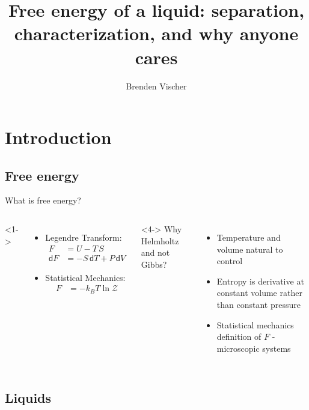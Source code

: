 \documentclass{beamer}
\title[Free energy of a liquid]{Free energy of a liquid: separation, characterization, and why anyone cares}
\author{Brenden Vischer}
\newcommand*{\diff}{\mathsf{d}}
\begin{document}


\begin{frame}
	\titlepage
\end{frame}


\section*{Introduction}
\subsection*{Free energy}
\begin{frame}{What is free energy?}
		\begin{columns}
			<1->
				\begin{itemize}[noitemsep]
				\item<2-> Legendre Transform: 
				\begin{align*}
				 	F &= U - T\,S\\
				 	\diff F &= - S\, \diff T + P\, \diff V
				\end{align*}
				\item<3-> Statistical Mechanics: 
				\begin{align*}
					F &= - k_B T \ln \mathcal Z
				\end{align*}
				\end{itemize}
			<4->
			Why Helmholtz and not Gibbs?
			\begin{itemize}
				\item<5-> Temperature and volume natural to control 
				\item<6-> Entropy is derivative at constant volume rather than constant pressure
				\item<7-> Statistical mechanics definition of $F$ - microscopic systems  
			\end{itemize}
		\end{columns}
\end{frame}

\subsection*{Liquids}
\begin{frame}
	
\end{frame}
\end{document}
